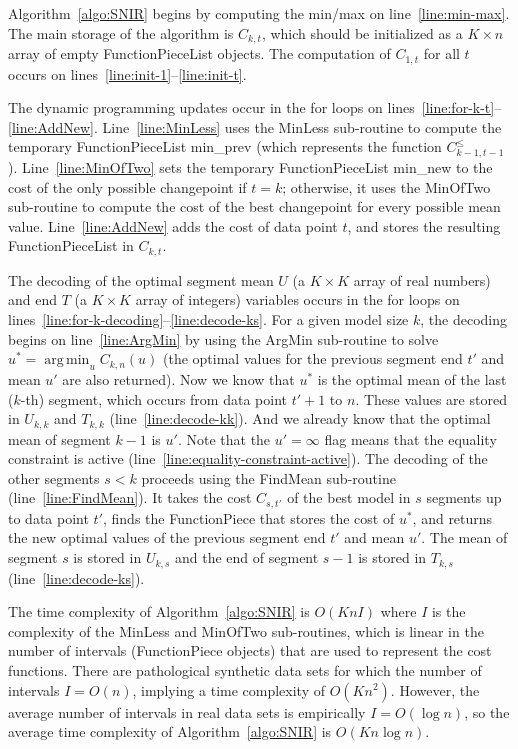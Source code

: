 \documentclass{article}
\newcommand{\FCC}{C}
\DeclareMathOperator*{\argmin}{arg\,min}
\begin{document}
Algorithm~\ref{algo:SNIR} begins by computing the min/max on
line~\ref{line:min-max}.  The main storage of the algorithm is
$\FCC_{k,t}$, which should be initialized as a $K\times n$ array of
empty FunctionPieceList objects. The computation of $\FCC_{1,t}$ for
all $t$ occurs on lines~\ref{line:init-1}--\ref{line:init-t}. 

The dynamic programming updates occur in the for loops on
lines~\ref{line:for-k-t}--\ref{line:AddNew}. Line~\ref{line:MinLess}
uses the MinLess sub-routine to compute the temporary
FunctionPieceList min\_prev (which represents the function
$\FCC_{k-1,t-1}^\leq$). Line~\ref{line:MinOfTwo} sets the temporary
FunctionPieceList min\_new to the cost of the only possible
changepoint if $t=k$; otherwise, it uses the MinOfTwo sub-routine to
compute the cost of the best changepoint for every possible mean
value. Line~\ref{line:AddNew} adds the cost of data point $t$, and
stores the resulting FunctionPieceList in $\FCC_{k,t}$.

The decoding of the optimal segment mean $U$ (a $K\times K$ array of
real numbers) and end $T$ (a $K\times K$ array of integers) variables
occurs in the for loops on
lines~\ref{line:for-k-decoding}--\ref{line:decode-ks}. For a given
model size $k$, the decoding begins on line~\ref{line:ArgMin} by using
the ArgMin sub-routine to solve $u^* = \argmin_u \FCC_{k,n}(u)$ (the
optimal values for the previous segment end $t'$ and mean $u'$ are
also returned). Now we know that $u^*$ is the optimal mean of the last
($k$-th) segment, which occurs from data point $t'+1$ to $n$. These
values are stored in $U_{k,k}$ and $T_{k,k}$
(line~\ref{line:decode-kk}). And we already know that the optimal mean
of segment $k-1$ is $u'$.  Note that the $u'=\infty$ flag means that
the equality constraint is active
(line~\ref{line:equality-constraint-active}). The decoding of the
other segments $s<k$ proceeds using the FindMean sub-routine
(line~\ref{line:FindMean}). It takes the cost $\FCC_{s,t'}$ of the
best model in $s$ segments up to data point $t'$, finds the
FunctionPiece that stores the cost of $u^*$, and returns the new
optimal values of the previous segment end $t'$ and mean $u'$. The
mean of segment $s$ is stored in $U_{k,s}$ and the end of segment
$s-1$ is stored in $T_{k,s}$ (line~\ref{line:decode-ks}).

The time complexity of Algorithm~\ref{algo:SNIR} is $O(K n I)$ where
$I$ is the complexity of the MinLess and MinOfTwo sub-routines, which
is linear in the number of intervals (FunctionPiece objects) that are
used to represent the cost functions. There are pathological synthetic
data sets for which the number of intervals $I=O(n)$, implying a
time complexity of $O(K n^2)$. However, the average number
of intervals in real data sets is empirically $I=O(\log n)$, so the
average time complexity of Algorithm~\ref{algo:SNIR} is
$O(K n \log n)$.
\end{document}
